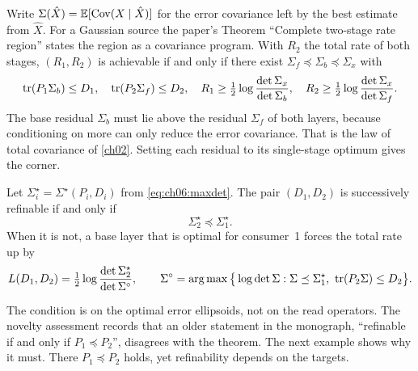 Write $\Sigma(\hat X)=\mathbb{E}[\operatorname{Cov}(X\mid\hat X)]$ for the error covariance left by the best estimate from $\hat X$. For a Gaussian source the paper's Theorem ``Complete two-stage rate region'' states the region as a covariance program. With $R_2$ the total rate of both stages, $(R_1,R_2)$ is achievable if and only if there exist $\Sigma_f\preceq\Sigma_b\preceq\Sigma_x$ with
\begin{equation}\label{eq:ch06:region}
\operatorname{tr}(P_1\Sigma_b)\le D_1,\quad \operatorname{tr}(P_2\Sigma_f)\le D_2,\quad
R_1\ge\tfrac12\log\frac{\det\Sigma_x}{\det\Sigma_b},\quad
R_2\ge\tfrac12\log\frac{\det\Sigma_x}{\det\Sigma_f}.
\end{equation}
The base residual $\Sigma_b$ must lie above the residual $\Sigma_f$ of both layers, because conditioning on more can only reduce the error covariance. That is the law of total covariance of \cref{ch02}. Setting each residual to its single-stage optimum gives the corner.

\begin{corollary}[Refinability]\label{cor:ch06:refine}
Let $\Sigma_i^\star=\Sigma^\star(P_i,D_i)$ from \cref{eq:ch06:maxdet}. The pair $(D_1,D_2)$ is successively refinable if and only if
\begin{equation}\label{eq:ch06:nest}
\Sigma_2^\star\preceq\Sigma_1^\star .
\end{equation}
When it is not, a base layer that is optimal for consumer~1 forces the total rate up by
\begin{equation}\label{eq:ch06:loss}
L(D_1,D_2)=\tfrac12\log\frac{\det\Sigma_2^\star}{\det\Sigma^\circ},\qquad
\Sigma^\circ=\argmax\big\{\log\det\Sigma : \Sigma\preceq\Sigma_1^\star,\ \tr(P_2\Sigma)\le D_2\big\}.
\end{equation}
\end{corollary}

The condition is on the optimal error ellipsoids, not on the read operators. The novelty assessment records that an older statement in the monograph, ``refinable if and only if $P_1\preceq P_2$'', disagrees with the theorem. The next example shows why it must. There $P_1\preceq P_2$ holds, yet refinability depends on the targets.

